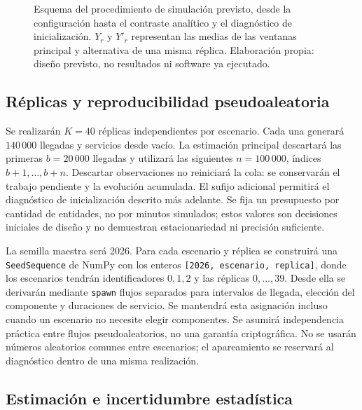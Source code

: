 \begin{figure}[htbp]
  \centering
  
  \caption{Esquema del procedimiento de simulación previsto, desde la configuración hasta el contraste analítico y el diagnóstico de inicialización. $Y_r$ y $Y'_r$ representan las medias de las ventanas principal y alternativa de una misma réplica. Elaboración propia: diseño previsto, no resultados ni software ya ejecutado.}
  \label{fig:procedimiento-simulacion}
\end{figure}

\subsection{Réplicas y reproducibilidad pseudoaleatoria}
\label{subsec:metodo-replicas}

Se realizarán $K=40$ réplicas independientes por escenario. Cada una generará $140\,000$ llegadas y servicios desde vacío. La estimación principal descartará las primeras $b=20\,000$ llegadas y utilizará las siguientes $n=100\,000$, índices $b+1,\ldots,b+n$. Descartar observaciones no reiniciará la cola: se conservarán el trabajo pendiente y la evolución acumulada. El sufijo adicional permitirá el diagnóstico de inicialización descrito más adelante. Se fija un presupuesto por cantidad de entidades, no por minutos simulados; estos valores son decisiones iniciales de diseño y no demuestran estacionariedad ni precisión suficiente.

La semilla maestra será 2026. Para cada escenario y réplica se construirá una \texttt{SeedSequence} de NumPy con los enteros \texttt{[2026, escenario, replica]}, donde los escenarios tendrán identificadores $0,1,2$ y las réplicas $0,\ldots,39$. Desde ella se derivarán mediante \texttt{spawn} flujos separados para intervalos de llegada, elección del componente y duraciones de servicio. Se mantendrá esta asignación incluso cuando un escenario no necesite elegir componentes. Se asumirá independencia práctica entre flujos pseudoaleatorios, no una garantía criptográfica. No se usarán números aleatorios comunes entre escenarios; el apareamiento se reservará al diagnóstico dentro de una misma realización.

\subsection{Estimación e incertidumbre estadística}
\label{subsec:metodo-inferencia}

